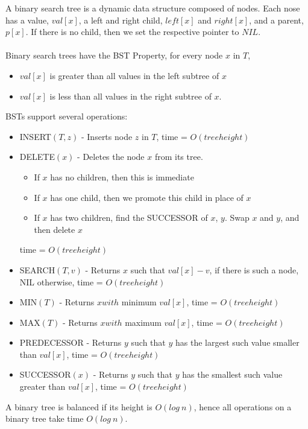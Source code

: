 \documentclass{article}
\theoremstyle{plain}
\theoremstyle{definition}
\begin{document}
    A binary search tree is a dynamic data structure composed of nodes. Each nose has a value, $val[x]$, a left and right child, $left[x]$ and $right[x]$, and a parent, $p[x]$. If there is no child, then we set the respective pointer to $NIL$. \\ \\
    Binary search trees have the BST Property, for every node $x$ in $T$,
    \begin{itemize}
        \item $val[x]$ is greater than all values in the left subtree of $x$
        \item $val[x]$ is less than all values in the right subtree of $x$. 
    \end{itemize} 
    
    \noindent BSTs support several operations:
    \begin{itemize}
        \item INSERT$(T, z)$ - Inserts node $z$ in $T$, time = $O(tree height)$
        \item DELETE$(x)$ - Deletes the node $x$ from its tree. 
            \begin{itemize}
                \item If $x$ has no children, then this is immediate
                \item If $x$ has one child, then we promote this child in place of $x$
                \item If $x$ has two children, find the SUCCESSOR of $x$, $y$. Swap $x$ and $y$, and then delete $x$
            \end{itemize} time = $O(tree height)$
        \item SEARCH$(T,v)$ - Returns $x$ such that $val[x] - v$, if there is such a node, NIL otherwise, time = $O(tree height)$
        \item MIN$(T)$ - Returns $x with$ minimum $val[x]$, time = $O(tree height)$
        \item MAX$(T)$ - Returns $x with$ maximum $val[x]$, time = $O(tree height)$
        \item PREDECESSOR - Returns $y$ such that $y$ has the largest such value smaller than $val[x]$, time = $O(tree height)$
        \item SUCCESSOR$(x)$ - Returns $y$ such that $y$ has the smallest such value greater than $val[x]$, time = $O(tree height)$
    \end{itemize}

    A binary tree is balanced if its height is $O(log \ n)$, hence all operations on a binary tree take time $O(log \ n)$. 
\end{document}
